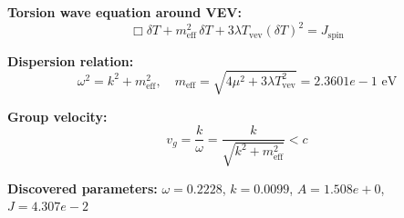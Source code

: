 
\textbf{Torsion wave equation around VEV:}
\begin{equation}
  \Box \delta T + m_{\text{eff}}^2 \, \delta T + 3\lambda T_{\text{vev}} (\delta T)^2 = J_{\text{spin}}
\end{equation}

\textbf{Dispersion relation:}
\begin{equation}
  \omega^2 = k^2 + m_{\text{eff}}^2, \quad
  m_{\text{eff}} = \sqrt{4\mu^2 + 3\lambda T_{\text{vev}}^2} = 2.3601e-1 \text{ eV}
\end{equation}

\textbf{Group velocity:}
\begin{equation}
  v_g = \frac{k}{\omega} = \frac{k}{\sqrt{k^2 + m_{\text{eff}}^2}} < c
\end{equation}

\textbf{Discovered parameters:}
$\omega = 0.2228$, \quad
$k = 0.0099$, \quad
$A = 1.508e+0$, \quad
$J = 4.307e-2$